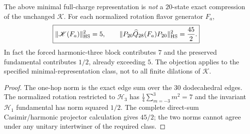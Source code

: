 \documentclass[11pt]{article}
\begin{document}
\begin{proposition}
\label{p1b:prop:fullcarrier-minimal-compression-no-go}
The above minimal full-charge representation is \emph{not} a
$20$-state exact compression of the unchanged $\mathscr K$.
For each normalized rotation flavor generator $F_a$,
\[
 \boxed{\|\mathscr K(F_a)\|_{\rm HS}^2=5,
 \qquad\|P_{20}\widehat Q_{28}(F_a)P_{20}\|_{\rm HS}^2={45\over2}.}
\]
In fact the forced harmonic-three block contributes $7$ and the
preserved fundamental contributes $1/2$, already exceeding $5$.
The objection applies to the specified minimal-representation class,
not to all finite dilations of $\mathscr K$.
\end{proposition}
\begin{proof}
The one-hop norm is the exact edge sum over the $30$ dodecahedral
edges.  The normalized rotation restricted to $\mathcal H_3$ has
$\tfrac14\sum_{m=-3}^{3}m^2=7$ and the invariant $\mathcal H_1$
fundamental has norm squared $1/2$.  The complete direct-sum
Casimir/harmonic projector calculation gives $45/2$; the two norms
cannot agree under any unitary intertwiner of the required class.
\end{proof}
\end{document}
